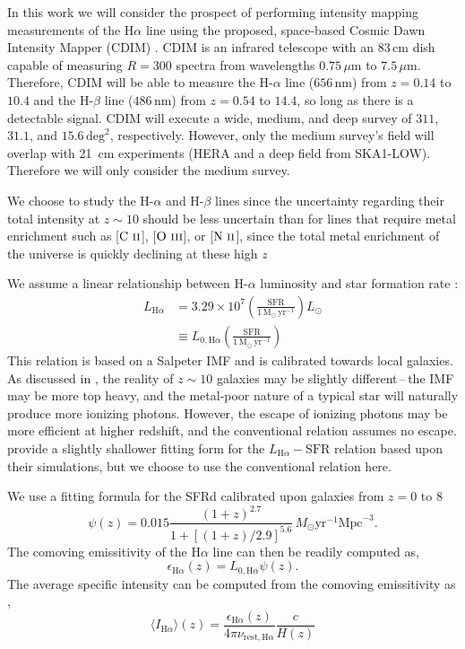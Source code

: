 \documentclass[a4paper,fleqn,usenatbib]{mnras}
\newcommand{\beq}{\begin{equation}}
\newcommand{\eeq}{\end{equation}}
\newcommand{\avg}[1]{\ensuremath{\langle #1 \rangle}}
\newcommand{\CII}{\ensuremath{\text{C~\textsc{ii}}}}
\newcommand{\OIII}{\ensuremath{\text{O~\textsc{iii}}}}
\newcommand{\NII}{\ensuremath{\text{N~\textsc{ii}}}}
\newcommand{\Ha}{\ensuremath{\text{H}\alpha}}
\newcommand{\Msun}{\ensuremath{\text{M}_\odot}}
\newcommand{\Mpc}{\ensuremath{\text{Mpc}}}
\newcommand{\SFR}{\ensuremath{\text{SFR}}}
\newcommand{\yr}{\ensuremath{\text{yr}}}
\begin{document}
In this work we will consider the prospect of performing intensity mapping
measurements of the H$\alpha$ line using the proposed, space-based Cosmic Dawn
Intensity Mapper (CDIM) \citep{2019arXiv190303144C}. CDIM is an infrared
telescope with an $83\,\text{cm}$ dish capable of measuring $R=300$ spectra
from wavelengths $0.75\,\mu\text{m}$ to $7.5\,\mu\text{m}$. Therefore, CDIM
will be able to measure the H-$\alpha$ line ($656\,\text{nm}$) from $z=0.14$
to $10.4$ and the H-$\beta$ line ($486\,\text{nm}$) from $z=0.54$ to $14.4$,
so long as there is a detectable signal. CDIM will execute a wide, medium, and
deep survey of $311$, $31.1$, and $15.6\,\text{deg}^2$, respectively. However,
only the medium survey's field will overlap with 21~cm experiments (HERA and a
deep field from SKA1-LOW). Therefore we will only consider the medium survey.

We choose to study the H-$\alpha$ and H-$\beta$ lines since the uncertainty
regarding their total intensity at $z\sim10$ should be less uncertain than for
lines that require metal enrichment such as [\CII], [\OIII], or [\NII], since
the total metal enrichment of the universe is quickly declining at these high
$z$

We assume a linear relationship between H-$\alpha$ luminosity and star
formation rate \citep{1998ARA&A..36..189K}:
\beq \label{eq:LHalpha_SFR}
\begin{split}
L_{\Ha} &= 3.29\times10^{7} \left(\frac{\SFR}{1\,\Msun\,\yr^{-1}}\right) L_{\odot} \\
        &\equiv L_{0,\Ha} \left(\frac{\SFR}{1\,\Msun\,\yr^{-1}}\right)
\end{split}
\eeq
This relation is based on a Salpeter IMF and is calibrated towards local
galaxies. As discussed in \citet{2019MNRAS.487.5902K}, the reality of
$z\sim10$ galaxies may be slightly different\,--\,the IMF may be more top
heavy, and the metal-poor nature of a typical star will naturally produce more
ionizing photons. However, the escape of ionizing photons may be more
efficient at higher redshift, and the conventional relation assumes no escape.
\citet{2019MNRAS.487.5902K} provide a slightly shallower fitting form for the
$L_{\Ha}-\SFR$ relation based upon their simulations, but we choose to use the
conventional relation here.

We use a fitting formula for the SFRd calibrated upon galaxies from $z=0$ to
$8$ \citep{2014ARA&A..52..415M}
\beq \label{eq:sfrd}
\psi(z) = 0.015 \frac{(1+z)^{2.7}}{1+\left[(1+z)/2.9\right]^{5.6}}\,M_{\odot}\yr^{-1}\Mpc^{-3} \text{.}
\eeq
The comoving emissitivity of the \Ha{} line can then be readily computed as,
\beq \label{eq:Ha_emiss}
\epsilon_{\Ha}(z) = L_{0,\Ha} \psi(z)\text{.}
\eeq
The average specific intensity can be computed from the comoving emissitivity
as \citep{2011ApJ...741...70L,2013ApJ...768...15P},
\beq \label{eq:int_from_em}
\avg{I_{\Ha}}(z) = \frac{\epsilon_{\Ha}(z)}{4\pi\nu_{\text{rest},\Ha}} \frac{c}{H(z)}
\eeq
\end{document}
